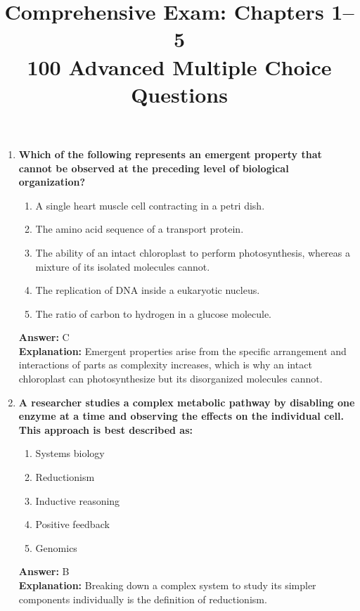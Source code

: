 \documentclass[11pt, a4paper]{article}
\title{\textbf{Comprehensive Exam: Chapters 1--5 \\ 100 Advanced Multiple Choice Questions}}
\author{}
\date{}
\begin{document}
\maketitle

\begin{enumerate}


\item \textbf{Which of the following represents an emergent property that cannot be observed at the preceding level of biological organization?}
\begin{enumerate}[label=\Alph*.]
    \item A single heart muscle cell contracting in a petri dish.
    \item The amino acid sequence of a transport protein.
    \item The ability of an intact chloroplast to perform photosynthesis, whereas a mixture of its isolated molecules cannot.
    \item The replication of DNA inside a eukaryotic nucleus.
    \item The ratio of carbon to hydrogen in a glucose molecule.
\end{enumerate}
\textbf{Answer:} C \\
\textbf{Explanation:} Emergent properties arise from the specific arrangement and interactions of parts as complexity increases, which is why an intact chloroplast can photosynthesize but its disorganized molecules cannot.

\item \textbf{A researcher studies a complex metabolic pathway by disabling one enzyme at a time and observing the effects on the individual cell. This approach is best described as:}
\begin{enumerate}[label=\Alph*.]
    \item Systems biology
    \item Reductionism
    \item Inductive reasoning
    \item Positive feedback
    \item Genomics
\end{enumerate}
\textbf{Answer:} B \\
\textbf{Explanation:} Breaking down a complex system to study its simpler components individually is the definition of reductionism.


\end{enumerate}
\end{document}
